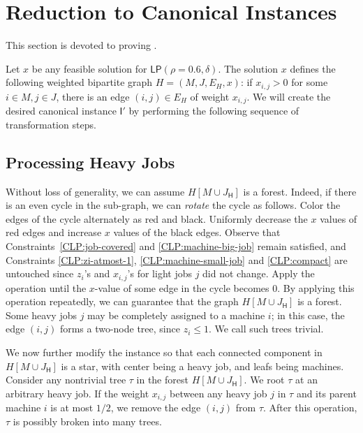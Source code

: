 \documentclass[11pt]{article}
\newcommand{\cI}{{\mathsf I}}
\newcommand{\sfH}{{\mathsf H}}
\newcommand{\LP}{{\mathsf{LP}}}
\begin{document}
\section{Reduction to Canonical Instances}

\label{sec:app-canonical}
\label{app:app-canonical}
This section is devoted to proving .
\redtocanon*

Let $x$ be any feasible solution for $\LP(\rho = 0.6,\delta)$.  The solution $x$ defines the following weighted bipartite graph $H = (M, J, E_H, x)$: if $x_{i,j} > 0$ for some $i \in M, j \in J$,  there is an edge $(i, j) \in E_H$ of weight $x_{i,j}$. We will create the desired canonical instance $\cI'$ by performing the following sequence of transformation steps. 

\subsection{Processing Heavy Jobs}
Without loss of generality, we can assume $H[M \cup {J_\sfH}]$ is a forest. Indeed, if there is an even cycle in the sub-graph, we can \emph{rotate} the cycle as follows. Color the edges of the cycle alternately as red and black. Uniformly decrease the $x$ values of red edges and increase $x$ values of the black edges. Observe that Constraints~\eqref{CLP:job-covered} and \eqref{CLP:machine-big-job} remain satisfied, and Constraints \eqref{CLP:zi-atmost-1}, \eqref{CLP:machine-small-job}  and \eqref{CLP:compact} are untouched since $z_i$'s and $x_{i,j}$'s for light jobs $j$ did not change.  Apply the operation until the $x$-value of some edge in the cycle becomes $0$.  By applying this operation repeatedly, we can guarantee that the graph $H[M \cup {J_\sfH}]$ is a forest. 
Some heavy jobs $j$ may be completely assigned to a machine $i$; in this case, the edge $(i,j)$ forms a two-node tree, since $z_i \leq 1$. We call such trees trivial.

We now further modify the instance so that each connected component in $H[M \cup {J_\sfH}]$ is a star, with center being a heavy job, and leafs being machines.  Consider any nontrivial tree $\tau$ in the forest $H[M \cup {J_\sfH}]$. We root $\tau$ at an arbitrary heavy job.  If the weight $x_{i,j}$ between any heavy job $j$ in $\tau$ and its parent machine $i$ is at most $1/2$, we remove the edge $(i, j)$ from $\tau$.  After this operation, $\tau$ is possibly broken into many trees.
\end{document}
